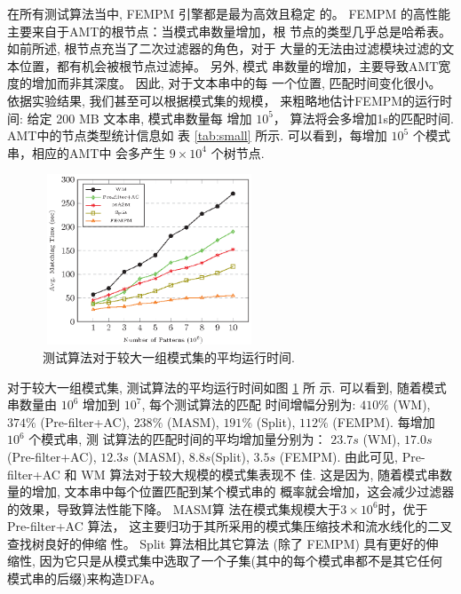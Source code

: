 在所有测试算法当中, \textsf{FEMPM} 引擎都是最为高效且稳定
的。 \textsf{FEMPM} 的高性能主要来自于AMT的根节点：当模式串数量增加，根
节点的类型几乎总是哈希表。 如前所述, 根节点充当了二次过滤器的角色，对于
大量的无法由过滤模块过滤的文本位置，都有机会被根节点过滤掉。 另外, 模式
串数量的增加，主要导致AMT宽度的增加而非其深度。 因此, 对于文本串中的每
一个位置, 匹配时间变化很小。 依据实验结果, 我们甚至可以根据模式集的规模，
来粗略地估计\textsf{FEMPM}的运行时间: 给定 200 MB 文本串, 模式串数量每
增加 $10^5$， 算法将会多增加1s的匹配时间. AMT中的节点类型统计信息如
表 \ref{tab:small} 所示. 可以看到，每增加 $10^5$ 个模式串，相应的AMT中
会多产生 $9 \times 10^4$ 个树节点.

\begin{figure}[!h]
  \centering
  \includegraphics[height=2in, width=2.5in]{figures/2_MPM/large_group}
  \caption{测试算法对于较大一组模式集的平均运行时间.}
  \label{fig:large_group}
\end{figure}

对于较大一组模式集, 测试算法的平均运行时间如图 \ref{fig:large_group} 所
示. 可以看到, 随着模式串数量由 $10^6$ 增加到 $10^7$, 每个测试算法的匹配
时间增幅分别为: $410\%$ (\textsf{WM}), $374\%$
(\textsf{Pre-filter+AC}), $238\%$ (\textsf{MASM}), $191\%$
(\textsf{Split}), $112\%$ (\textsf{FEMPM}). 每增加 $10^6$ 个模式串, 测
试算法的匹配时间的平均增加量分别为： $23.7s$ (\textsf{WM}), $17.0s$
(\textsf{Pre-filter+AC}), $12.3s$ (\textsf{MASM}),
$8.8s$(\textsf{Split}), $3.5s$ (\textsf{FEMPM}). 由此可见,
\textsf{Pre-filter+AC} 和 \textsf{WM} 算法对于较大规模的模式集表现不
佳. 这是因为, 随着模式串数量的增加, 文本串中每个位置匹配到某个模式串的
概率就会增加，这会减少过滤器的效果，导致算法性能下降。 \textsf{MASM}算
法在模式集规模大于$3 \times 10^6$时，优于 \textsf{Pre-filter+AC} 算法，
这主要归功于其所采用的模式集压缩技术和流水线化的二叉查找树良好的伸缩
性。 \textsf{Split} 算法相比其它算法 (除了 \textsf{FEMPM}) 具有更好的伸
缩性, 因为它只是从模式集中选取了一个子集(其中的每个模式串都不是其它任何
模式串的后缀)来构造DFA。

